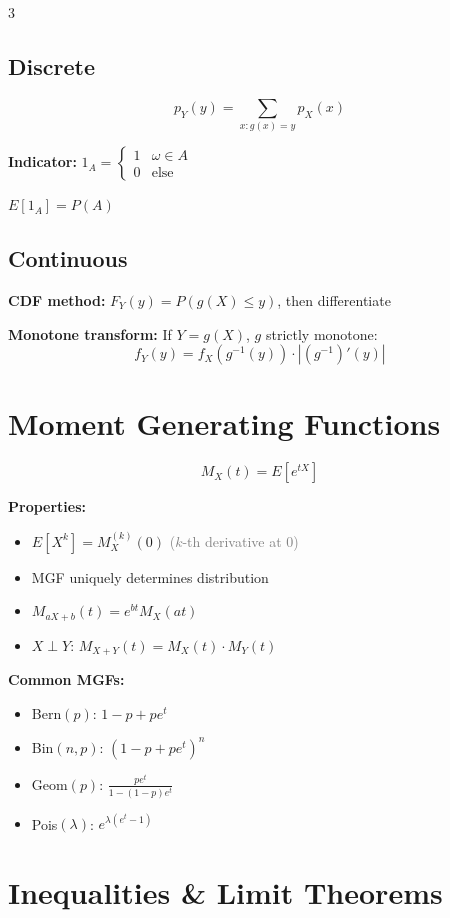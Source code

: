 \documentclass[10pt,landscape]{article}
\newcommand{\note}[1]{\textcolor{gray}{\small(#1)}}
\begin{document}
\begin{multicols}{3}
\subsection{Discrete}
$$p_Y(y) = \sum_{x: g(x) = y} p_X(x)$$

\textbf{Indicator:} $1_A = \begin{cases} 1 & \omega \in A \\ 0 & \text{else} \end{cases}$

$E[1_A] = P(A)$

\subsection{Continuous}
\textbf{CDF method:} $F_Y(y) = P(g(X) \leq y)$, then differentiate

\textbf{Monotone transform:} If $Y = g(X)$, $g$ strictly monotone:
$$f_Y(y) = f_X(g^{-1}(y)) \cdot |(g^{-1})'(y)|$$

\section{Moment Generating Functions}

$$M_X(t) = E[e^{tX}]$$

\textbf{Properties:}
\begin{itemize}[leftmargin=*,noitemsep]
\item $E[X^k] = M_X^{(k)}(0)$ \note{$k$-th derivative at 0}
\item MGF uniquely determines distribution
\item $M_{aX+b}(t) = e^{bt} M_X(at)$
\item $X \perp Y$: $M_{X+Y}(t) = M_X(t) \cdot M_Y(t)$
\end{itemize}

\textbf{Common MGFs:}
\begin{itemize}[leftmargin=*,noitemsep]
\item Bern$(p)$: $1 - p + pe^t$
\item Bin$(n, p)$: $(1 - p + pe^t)^n$
\item Geom$(p)$: $\frac{pe^t}{1 - (1-p)e^t}$
\item Pois$(\lambda)$: $e^{\lambda(e^t - 1)}$
\end{itemize}

\section{Inequalities \& Limit Theorems}


\end{multicols}
\end{document}
